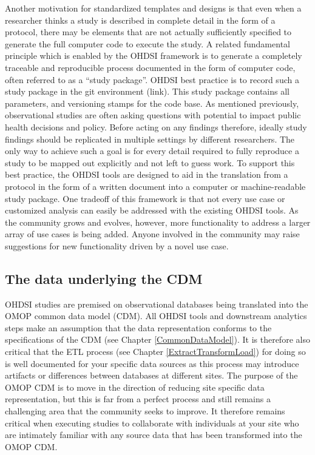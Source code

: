 \documentclass[11pt]{book}
\theoremstyle{definition}
\theoremstyle{definition}
\theoremstyle{definition}
\theoremstyle{remark}
\begin{document}
Another motivation for standardized templates and designs is that even when a researcher thinks a study is described in complete detail in the form of a protocol, there may be elements that are not actually sufficiently specified to generate the full computer code to execute the study. A related fundamental principle which is enabled by the OHDSI framework is to generate a completely traceable and reproducible process documented in the form of computer code, often referred to as a ``study package''. OHDSI best practice is to record such a study package in the git environment (link). This study package contains all parameters, and versioning stamps for the code base. As mentioned previously, observational studies are often asking questions with potential to impact public health decisions and policy. Before acting on any findings therefore, ideally study findings should be replicated in multiple settings by different researchers. The only way to achieve such a goal is for every detail required to fully reproduce a study to be mapped out explicitly and not left to guess work. To support this best practice, the OHDSI tools are designed to aid in the translation from a protocol in the form of a written document into a computer or machine-readable study package. One tradeoff of this framework is that not every use case or customized analysis can easily be addressed with the existing OHDSI tools. As the community grows and evolves, however, more functionality to address a larger array of use cases is being added. Anyone involved in the community may raise suggestions for new functionality driven by a novel use case.

\hypertarget{the-data-underlying-the-cdm}{%
\subsection{The data underlying the CDM}\label{the-data-underlying-the-cdm}}

OHDSI studies are premised on observational databases being translated into the OMOP common data model (CDM). All OHDSI tools and downstream analytics steps make an assumption that the data representation conforms to the specifications of the CDM (see Chapter \ref{CommonDataModel}). It is therefore also critical that the ETL process (see Chapter \ref{ExtractTransformLoad}) for doing so is well documented for your specific data sources as this process may introduce artifacts or differences between databases at different sites. The purpose of the OMOP CDM is to move in the direction of reducing site specific data representation, but this is far from a perfect process and still remains a challenging area that the community seeks to improve. It therefore remains critical when executing studies to collaborate with individuals at your site who are intimately familiar with any source data that has been transformed into the OMOP CDM.
\end{document}
